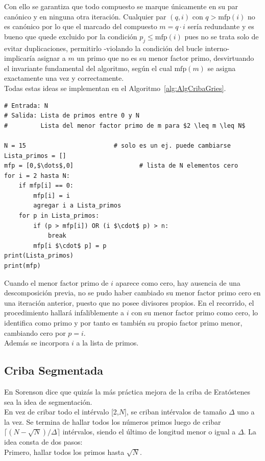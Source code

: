 Con ello se garantiza que todo compuesto se marque únicamente en su par canónico y en ninguna otra iteración.
Cualquier par $(q,i)$ con $q > \text{mfp}(i)$ no es canónico por lo que el marcado del compuesto $m = q \cdot i$ sería redundante y es bueno que quede excluido por la condición $p_j \leq \text{mfp}(i)$ pues no se trata solo de evitar duplicaciones, permitirlo -violando la condición del bucle interno- implicaría asignar a $m$ un primo que no es su menor factor primo, desvirtuando el invariante fundamental del algoritmo, según el cual $\text{mfp}(m)$ se asigna exactamente una vez y correctamente.\\

Todas estas ideas se implementan en el Algoritmo~\ref{alg:AlgCribaGries}.

\begin{lstlisting}[caption={Criba de Gries-Misra}, label={alg:AlgCribaGries}, mathescape=true]
# Entrada: N
# Salida: Lista de primos entre 0 y N
#         Lista del menor factor primo de m para $2 \leq m \leq N$ 

N = 15                        # solo es un ej. puede cambiarse
Lista_primos = []
mfp = [0,$\dots$,0]                  # lista de N elementos cero
for i = 2 hasta N:
    if mfp[i] == 0:
        mfp[i] = i
        agregar i a Lista_primos
    for p in Lista_primos:
        if (p > mfp[i]) OR (i $\cdot$ p) > n:
            break
        mfp[i $\cdot$ p] = p
print(Lista_primos)
print(mfp)
\end{lstlisting}

Cuando el menor factor primo de $i$ aparece como cero,  hay ausencia de una descomposición previa, no se pudo haber cambiado su menor factor primo cero en una iteración anterior, puesto que no posee divisores propios. En el recorrido, el procedimiento hallará infaliblemente a $i$ con su menor factor primo como cero, lo identifica como primo y por tanto es también su propio factor primo menor, cambiando cero por $p = i$. \\
Además se incorpora $i$ a la lista de primos.

\subsection{Criba Segmentada}
En \cite{Sorenson90} Sorenson dice que quizás la más práctica mejora de la criba de Eratóstenes sea la idea de segmentación. \\
En vez de cribar todo el intérvalo [2,$N$], se criban intérvalos de tamaño $\Delta$ uno a la vez. Se termina de hallar todos los números primos luego de cribar $\lceil(N-\sqrt{N})/\Delta\rceil$ intérvalos, siendo el último de longitud menor o igual a $\Delta$. La idea consta de dos pasos: \\
Primero, hallar todos los primos hasta $\sqrt{N}$.\\

